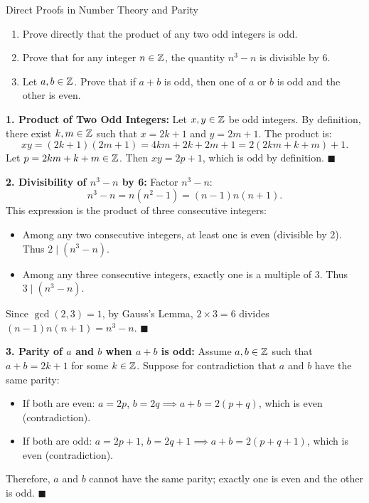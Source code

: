 \begin{exercise}{Direct Proofs in Number Theory and Parity}
\begin{enumerate}[leftmargin=1.5em,itemsep=2pt]
  \item Prove directly that the product of any two odd integers is odd.
  \item Prove that for any integer $n \in \mathbb{Z}$, the quantity $n^3 - n$ is divisible by $6$.
  \item Let $a, b \in \mathbb{Z}$. Prove that if $a + b$ is odd, then one of $a$ or $b$ is odd and the other is even.
\end{enumerate}
\end{exercise}

\begin{tabletworkspace}[5.0cm]
\end{tabletworkspace}

\begin{solution}
\textbf{1. Product of Two Odd Integers:}
Let $x, y \in \mathbb{Z}$ be odd integers. By definition, there exist $k, m \in \mathbb{Z}$ such that $x = 2k + 1$ and $y = 2m + 1$.
The product is:
\[
xy = (2k + 1)(2m + 1) = 4km + 2k + 2m + 1 = 2(2km + k + m) + 1.
\]
Let $p = 2km + k + m \in \mathbb{Z}$. Then $xy = 2p + 1$, which is odd by definition. \hfill $\blacksquare$

\textbf{2. Divisibility of $n^3 - n$ by 6:}
Factor $n^3 - n$:
\[
n^3 - n = n(n^2 - 1) = (n - 1)n(n + 1).
\]
This expression is the product of three consecutive integers:
\begin{itemize}[leftmargin=1.5em,itemsep=2pt]
  \item Among any two consecutive integers, at least one is even (divisible by 2). Thus $2 \mid (n^3 - n)$.
  \item Among any three consecutive integers, exactly one is a multiple of 3. Thus $3 \mid (n^3 - n)$.
\end{itemize}
Since $\gcd(2, 3) = 1$, by Gauss's Lemma, $2 \times 3 = 6$ divides $(n - 1)n(n + 1) = n^3 - n$. \hfill $\blacksquare$

\textbf{3. Parity of $a$ and $b$ when $a+b$ is odd:}
Assume $a, b \in \mathbb{Z}$ such that $a + b = 2k + 1$ for some $k \in \mathbb{Z}$.
Suppose for contradiction that $a$ and $b$ have the same parity:
\begin{itemize}[leftmargin=1.5em,itemsep=1pt]
  \item If both are even: $a = 2p$, $b = 2q \implies a + b = 2(p+q)$, which is even (contradiction).
  \item If both are odd: $a = 2p+1$, $b = 2q+1 \implies a + b = 2(p+q+1)$, which is even (contradiction).
\end{itemize}
Therefore, $a$ and $b$ cannot have the same parity; exactly one is even and the other is odd. \hfill $\blacksquare$
\end{solution}

